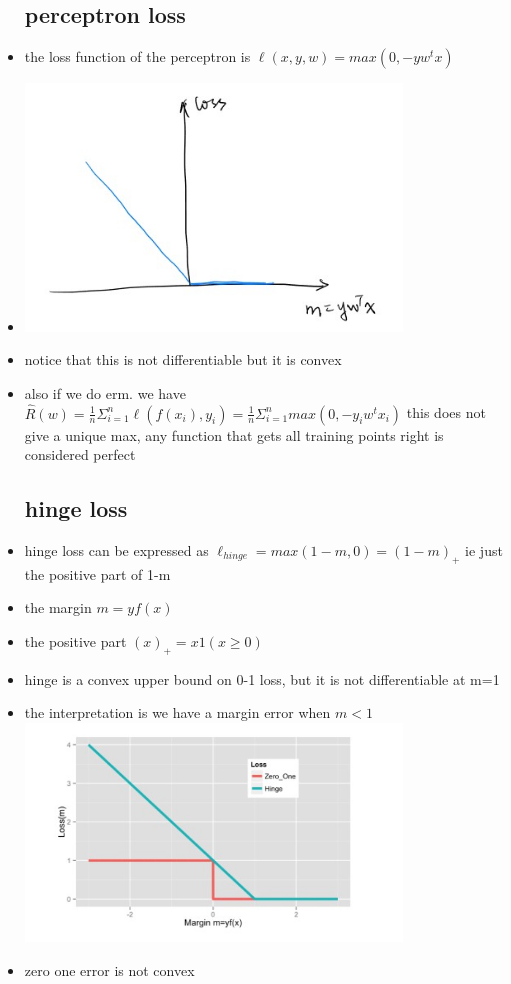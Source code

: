 \documentclass{article}
\begin{document}
\begin{itemize}
\subsection{perceptron loss}
\item the loss function of the perceptron  is $\ell(x,y,w)=max(0,-yw^{t}x)$
\item \includegraphics[width=10cm]{lecture_notes/lecture_4/immmages/l4_5.jpg}
\item notice that this is not differentiable but it is convex 
\item also if we do erm. we have $\hat{R}(w)=\frac{1}{n}\Sigma_{i=1}^{n}\ell(f(x_i),y_i)=\frac{1}{n}\Sigma_{i=1}^{n}max(0,-y_iw^tx_i)$ this does not give a unique max, any function that gets all training points right is considered perfect
\subsection{hinge loss}
\item hinge loss can be expressed as $\ell_{hinge}=max(1-m,0)=(1-m)_{+}$ ie just the positive part of 1-m
\item the margin $m=yf(x)$ 
\item the positive part $(x)_{+}=x1(x\geq 0)$
\item hinge is a convex upper bound on 0-1 loss, but it is not differentiable at m=1
\item the interpretation is we have a margin error when $m<1$
\includegraphics[width=10cm]{lecture_notes/lecture_4/immmages/l4_6.jpg}
\item zero one error is not convex

\end{itemize}
\end{document}
